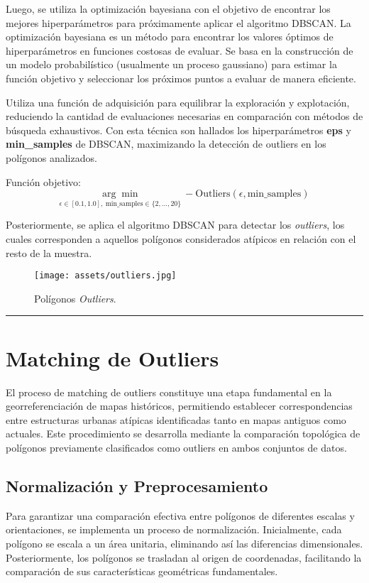 \documentclass[twocolumn, fontsize=10pt]{article}
\begin{document}
Luego, se utiliza la optimización bayesiana con el objetivo de encontrar los mejores hiperparámetros para próximamente aplicar el algoritmo DBSCAN. La optimización bayesiana es un método para encontrar los valores óptimos de hiperparámetros en funciones costosas de evaluar. Se basa en la construcción de un modelo probabilístico (usualmente un proceso gaussiano) para estimar la función objetivo y seleccionar los próximos puntos a evaluar de manera eficiente. 

Utiliza una función de adquisición para equilibrar la 
exploración y explotación, reduciendo la cantidad de 
evaluaciones necesarias en comparación con métodos de 
búsqueda exhaustivos. Con esta técnica son hallados 
los hiperparámetros \textbf{eps} y \textbf{min\_samples} de DBSCAN, 
maximizando la detección de outliers en los polígonos 
analizados.

Función objetivo: \[
\underset{\epsilon \in [0.1, 1.0], \ \text{min\_samples} \in \{2, \dots, 20\}}{\arg\min} \ - \text{Outliers}(\epsilon, \text{min\_samples})
\]

Posteriormente, se aplica el algoritmo DBSCAN para 
detectar los \textit{outliers}, 
los cuales corresponden a aquellos polígonos 
considerados atípicos en relación con el resto de la 
muestra.

\begin{figure}[H]
    \centering
    \texttt{[image: assets/outliers.jpg]}
    \caption{Polígonos \textit{Outliers}.}
    \label{fig:poligonos_atipicos}
\end{figure}

\rule{\linewidth}{0.5pt}
\section{Matching de Outliers}

El proceso de matching de outliers constituye una etapa fundamental en la georreferenciación de mapas históricos, permitiendo establecer correspondencias entre estructuras urbanas atípicas identificadas tanto en mapas antiguos como actuales. Este procedimiento se desarrolla mediante la comparación topológica de polígonos previamente clasificados como outliers en ambos conjuntos de datos.

\subsection{Normalización y Preprocesamiento}

Para garantizar una comparación efectiva entre polígonos de diferentes escalas y orientaciones, se implementa un proceso de normalización. Inicialmente, cada polígono se escala a un área unitaria, eliminando así las diferencias dimensionales. Posteriormente, los polígonos se trasladan al origen de coordenadas, facilitando la comparación de sus características geométricas fundamentales.
\end{document}
